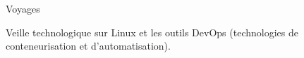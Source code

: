 

\begin{cventries}


      \begin{cvitems} %
        \item {Voyages}
        \item {Veille technologique sur Linux et les outils DevOps (technologies de conteneurisation et d'automatisation).}
      \end{cvitems}

\end{cventries}
